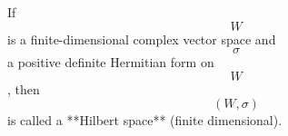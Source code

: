If $$W$$ is a finite-dimensional complex vector space and $$\sigma$$ a positive definite Hermitian form on $$W$$, then $$(W, \sigma)$$ is called a **Hilbert space** (finite dimensional).
